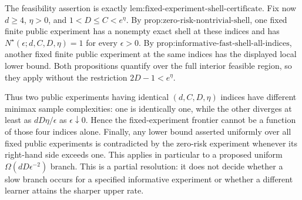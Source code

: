 The feasibility assertion is exactly \(\text{lem:fixed-experiment-shell-certificate}\). Fix now \(d\ge4\), \(\eta>0\), and \(1<D\le C<e^\eta\). By \(\text{prop:zero-risk-nontrivial-shell}\), one fixed finite public experiment has a nonempty exact shell at these indices and has \(N^\star(\epsilon;d,C,D,\eta)=1\) for every \(\epsilon>0\). By \(\text{prop:informative-fast-shell-all-indices}\), another fixed finite public experiment at the same indices has the displayed local lower bound. Both propositions quantify over the full interior feasible region, so they apply without the restriction \(2D-1<e^\eta\).

Thus two public experiments having identical \((d,C,D,\eta)\) indices have different minimax sample complexities: one is identically one, while the other diverges at least as \(dD\eta/\epsilon\) as \(\epsilon\downarrow0\). Hence the fixed-experiment frontier cannot be a function of those four indices alone. Finally, any lower bound asserted uniformly over all fixed public experiments is contradicted by the zero-risk experiment whenever its right-hand side exceeds one. This applies in particular to a proposed uniform \(\Omega(dD\epsilon^{-2})\) branch. This is a partial resolution: it does not decide whether a slow branch occurs for a specified informative experiment or whether a different learner attains the sharper upper rate.